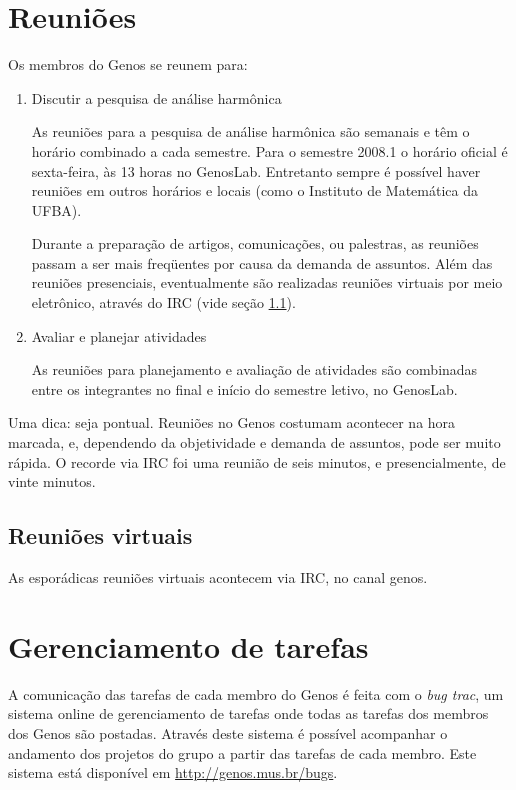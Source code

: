 \documentclass[12pt,brazil]{book}
\begin{document}
\section{Reuniões}
\label{sec:reunioes}

Os membros do Genos se reunem para:

\begin{enumerate}
\item Discutir a pesquisa de análise harmônica

  As reuniões para a pesquisa de análise harmônica são semanais e têm
  o horário combinado a cada semestre. Para o semestre 2008.1 o
  horário oficial é sexta-feira, às 13 horas no GenosLab. Entretanto
  sempre é possível haver reuniões em outros horários e locais (como o
  Instituto de Matemática da UFBA).

  Durante a preparação de artigos, comunicações, ou palestras, as
  reuniões passam a ser mais freqüentes por causa da demanda de
  assuntos. Além das reuniões presenciais, eventualmente são
  realizadas reuniões virtuais por meio eletrônico, através do IRC
  (vide seção \ref{sec:reunioes-virtuais}).

\item Avaliar e planejar atividades

  As reuniões para planejamento e avaliação de atividades são
  combinadas entre os integrantes no final e início do semestre
  letivo, no GenosLab.

\end{enumerate}

Uma dica: seja pontual. Reuniões no Genos costumam acontecer na hora
marcada, e, dependendo da objetividade e demanda de assuntos, pode ser
muito rápida. O recorde via IRC foi uma reunião de seis minutos, e
presencialmente, de vinte minutos.

\subsection{Reuniões virtuais}
\label{sec:reunioes-virtuais}

As esporádicas reuniões virtuais acontecem via IRC, no canal genos.

\section{Gerenciamento de tarefas}
\label{sec:gerenc-de-taref}

A comunicação das tarefas de cada membro do Genos é feita com o
\textit{bug trac}, um sistema online de gerenciamento de tarefas onde
todas as tarefas dos membros dos Genos são postadas. Através deste
sistema é possível acompanhar o andamento dos projetos do grupo a
partir das tarefas de cada membro. Este sistema está disponível em
\url{http://genos.mus.br/bugs}.
\end{document}
